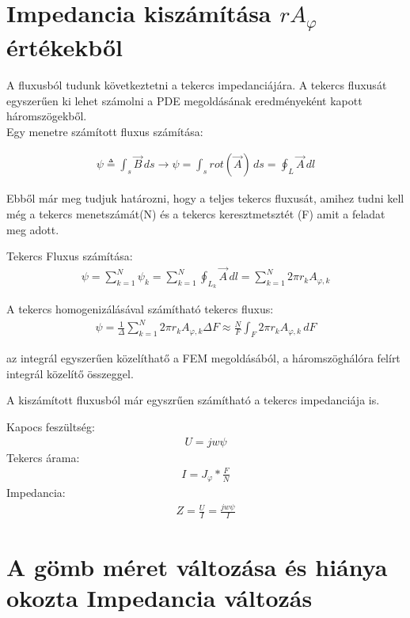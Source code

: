 \section{Impedancia kiszámítása $rA_{\varphi}$ értékekből}


A fluxusból tudunk következtetni a tekercs impedanciájára. A tekercs fluxusát
egyszerűen ki lehet számolni a PDE megoldásának eredményeként kapott háromszögekből.\\

Egy menetre számított fluxus számítása:

\begin{align}
    \psi \triangleq \int_{s}^{}  \vec{B} \,ds
    \rightarrow  \psi = \int_{s} rot(\vec{A}) \,ds
    = \oint_L \vec{A} \,dl
\end{align}

Ebből már meg tudjuk határozni, hogy a teljes tekercs fluxusát, amihez tudni kell még a
tekercs menetszámát(N) és a tekercs keresztmetsztét (F) amit a feladat meg adott.

Tekercs Fluxus számítása:
\begin{align}
    \psi = \sum_{k = 1}^{N}  \psi_k = \sum_{k = 1}^{N} \oint_{L_k} \vec{A} \,dl
    = \sum_{k = 1}^{N} 2 \pi r_k A_{\varphi,k}
\end{align}

A tekercs homogenizálásával számítható tekercs fluxus:
\begin{align}
    \psi = \frac{1}{\Delta} \sum_{k=1}^N  2 \pi r_k A_{\varphi,k} \Delta F \approx
    \frac{N}{F} \int_{F} 2 \pi r_k A_{\varphi,k} \,dF
\end{align}

az integrál egyszerűen közelíthatő a FEM megoldásából, a háromszöghálóra felírt
integrál közelítő összeggel.

A kiszámított fluxusból már egyszrűen számítható a tekercs impedanciája is.

Kapocs feszültség:
\begin{align}
    U = jw\psi
\end{align}
Tekercs árama:
\begin{align}
    I = J_{\varphi} * \frac{F}{N}
\end{align}
Impedancia:
\begin{align}
    Z = \frac{U}{I} = \frac{jw\psi}{I}
\end{align}

\section{A gömb méret változása és hiánya okozta Impedancia változás}

